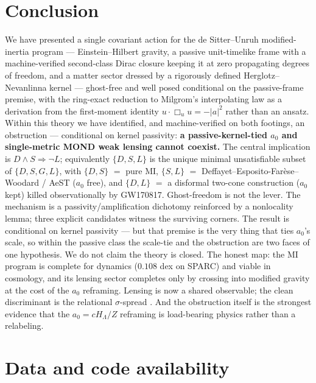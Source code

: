 \documentclass[11pt]{article}
\newcommand{\Boxu}{\Box_u}
\begin{document}
\section{Conclusion}\label{sec:conclusion}

We have presented a single covariant action for the de Sitter--Unruh modified-inertia program --- Einstein--Hilbert gravity, a passive unit-timelike frame with a machine-verified second-class Dirac closure keeping it at zero propagating degrees of freedom, and a matter sector dressed by a rigorously defined Herglotz--Nevanlinna kernel --- ghost-free and well posed conditional on the passive-frame premise, with the ring-exact reduction to Milgrom's interpolating law as a derivation from the first-moment identity $u\cdot\Boxu u=-|a|^2$ rather than an ansatz. Within this theory we have identified, and machine-verified on both footings, an obstruction --- conditional on kernel passivity: \textbf{a passive-kernel-tied $a_0$ and single-metric MOND weak lensing cannot coexist.} The central implication is $D\wedge S\Rightarrow\lnot L$; equivalently $\{D,S,L\}$ is the unique minimal unsatisfiable subset of $\{D,S,G,L\}$, with $\{D,S\}$ $=$ pure MI, $\{S,L\}$ $=$ Deffayet--Esposito-Far\`ese--Woodard / AeST ($a_0$ free), and $\{D,L\}$ $=$ a disformal two-cone construction ($a_0$ kept) killed observationally by GW170817. Ghost-freedom is not the lever. The mechanism is a passivity/amplification dichotomy reinforced by a nonlocality lemma; three explicit candidates witness the surviving corners. The result is conditional on kernel passivity --- but that premise is the very thing that ties $a_0$'s scale, so within the passive class the scale-tie and the obstruction are two faces of one hypothesis. We do not claim the theory is closed. The honest map: the MI program is complete for dynamics ($0.108$ dex on SPARC) and viable in cosmology, and its lensing sector completes only by crossing into modified gravity at the cost of the $a_0$ reframing. Lensing is now a shared observable; the clean discriminant is the relational $\sigma$-spread \cite{zsigma}. And the obstruction itself is the strongest evidence that the $a_0=cH_\Lambda/Z$ reframing is load-bearing physics rather than a relabeling.

\section*{Data and code availability}
\end{document}

